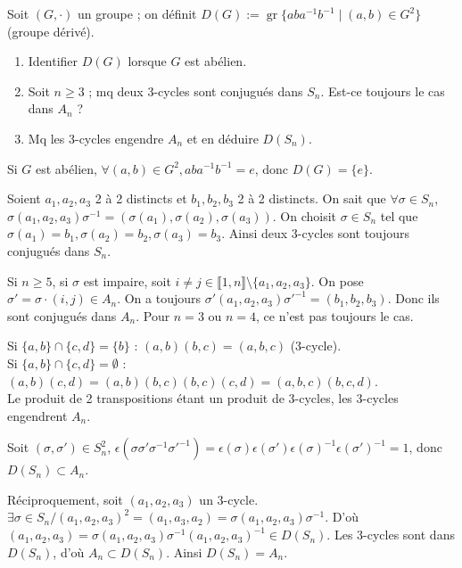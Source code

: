 
\begin{statementbox}
Soit $(G,\cdot)$ un groupe ; on définit $D(G) := \operatorname{gr}\{a b a^{-1} b^{-1} \mid (a,b) \in G^2\}$ (groupe dérivé).
\begin{enumerate}[label=\alph*)]
  \item Identifier $D(G)$ lorsque $G$ est abélien.
  \item Soit $n \geq 3$ ; mq deux 3-cycles sont conjugués dans $S_n$. Est-ce toujours le cas dans $A_n$ ?
  \item Mq les 3-cycles engendre $A_n$ et en déduire $D(S_n)$.
\end{enumerate}
\end{statementbox}

\begin{solution}
Si $G$ est abélien, $\forall (a,b) \in G^2, a b a^{-1} b^{-1} = e$, donc $\boxed{D(G) = \{e\}}$.

Soient $a_1, a_2, a_3$ 2 à 2 distincts et $b_1, b_2, b_3$ 2 à 2 distincts.
On sait que $\forall \sigma \in S_n$, $\sigma (a_1, a_2, a_3) \sigma^{-1} = (\sigma(a_1), \sigma(a_2), \sigma(a_3))$.
On choisit $\sigma \in S_n$ tel que $\sigma(a_1) = b_1, \sigma(a_2) = b_2, \sigma(a_3) = b_3$.
Ainsi deux 3-cycles sont toujours conjugués dans $S_n$.

Si $n \geq 5$, si $\sigma$ est impaire, soit $i \neq j \in \llbracket 1, n \rrbracket \setminus \{a_1, a_2, a_3\}$.
On pose $\sigma' = \sigma \cdot (i,j) \in A_n$.
On a toujours $\sigma'(a_1, a_2, a_3) \sigma'^{-1} = (b_1, b_2, b_3)$. Donc ils sont conjugués dans $A_n$.
Pour $n = 3$ ou $n = 4$, ce n'est pas toujours le cas.

Si $\{a,b\} \cap \{c,d\} = \{b\}$ : $(a,b)(b,c) = (a,b,c)$ (3-cycle). \\
Si $\{a,b\} \cap \{c,d\} = \emptyset$ : $(a,b)(c,d) = (a,b)(b,c)(b,c)(c,d) = (a,b,c)(b,c,d)$. \\
Le produit de 2 transpositions étant un produit de 3-cycles, les 3-cycles engendrent $A_n$.

Soit $(\sigma, \sigma') \in S_n^2$, $\epsilon(\sigma \sigma' \sigma^{-1} \sigma'^{-1}) = \epsilon(\sigma) \epsilon(\sigma') \epsilon(\sigma)^{-1} \epsilon(\sigma')^{-1} = 1$, donc $D(S_n) \subset A_n$.

Réciproquement, soit $(a_1, a_2, a_3)$ un 3-cycle.
$\exists \sigma \in S_n / (a_1, a_2, a_3)^2 = (a_1, a_3, a_2) = \sigma (a_1, a_2, a_3) \sigma^{-1}$.
D'où $(a_1, a_2, a_3) = \sigma (a_1, a_2, a_3) \sigma^{-1} (a_1, a_2, a_3)^{-1} \in D(S_n)$.
Les 3-cycles sont dans $D(S_n)$, d'où $A_n \subset D(S_n)$.
Ainsi $\boxed{D(S_n) = A_n}$.
\end{solution}

